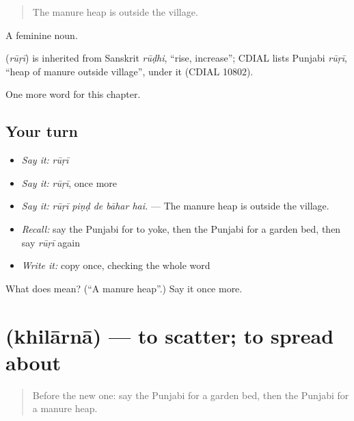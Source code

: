 \begin{quote}
The manure heap is outside the village.
\end{quote}

A feminine noun.

\begin{cousinweb}
\textbf{} (\emph{rūṛī}) is inherited from Sanskrit \emph{rūḍhi}, \textquotedblleft{}rise, increase\textquotedblright{}; CDIAL lists Punjabi \emph{rūṛī}, \textquotedblleft{}heap of manure outside village\textquotedblright{}, under it (CDIAL 10802).
\end{cousinweb}

\begin{grammarlens}[title={What you've built}]
One more word for this chapter.
\end{grammarlens}

\subsection*{Your turn}
\begin{itemize}
\raggedright
  \item \emph{Say it:} \emph{rūṛī}
  \item \emph{Say it:} \emph{rūṛī}, once more
  \item \emph{Say it:} \emph{rūṛī piṇḍ de bāhar hai.} — The manure heap is outside the village.
  \item \emph{Recall:} say the Punjabi for to yoke, then the Punjabi for a garden bed, then say \emph{rūṛī} again
  \item \emph{Write it:} copy \textbf{} once, checking the whole word
\end{itemize}

\begin{tcolorbox}[breakable,colback=teal!4,colframe=teal!35!black,title={Before you move on}]
What does  mean? (\textquotedblleft{}A manure heap\textquotedblright{}.) Say it once more.
\end{tcolorbox}
\section[\texorpdfstring{\pa{ਖਿਲਾਰਨਾ} (khilārnā)}{ਖਿਲਾਰਨਾ (khilārnā)}]{ (khilārnā) — to scatter; to spread about}

\label{lesson:PA-C302-khilarna}



\begin{quote}
Before the new one: say the Punjabi for a garden bed, then the Punjabi for a manure heap.
\end{quote}

